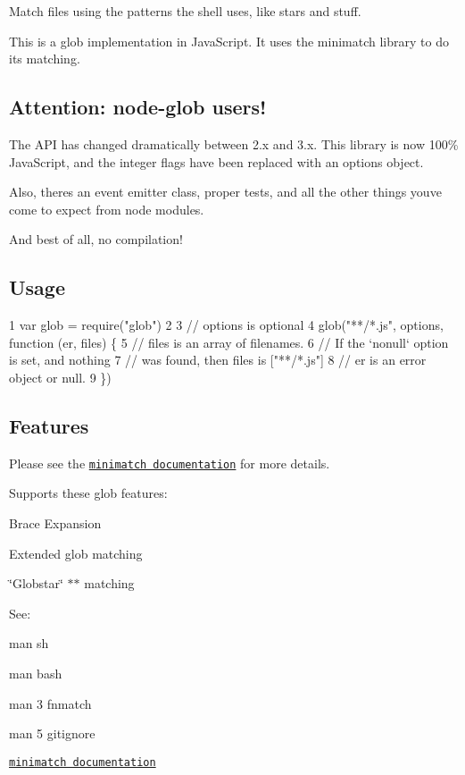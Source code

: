 Match files using the patterns the shell uses, like stars and stuff.

This is a glob implementation in Java\+Script. It uses the {\ttfamily minimatch} library to do its matching.

\subsection*{Attention\+: node-\/glob users!}

The A\+P\+I has changed dramatically between 2.\+x and 3.\+x. This library is now 100\% Java\+Script, and the integer flags have been replaced with an options object.

Also, there\textquotesingle{}s an event emitter class, proper tests, and all the other things you\textquotesingle{}ve come to expect from node modules.

And best of all, no compilation!

\subsection*{Usage}


\begin{DoxyCode}
1 var glob = require("glob")
2 
3 // options is optional
4 glob("**/*.js", options, function (er, files) \{
5   // files is an array of filenames.
6   // If the `nonull` option is set, and nothing
7   // was found, then files is ["**/*.js"]
8   // er is an error object or null.
9 \})
\end{DoxyCode}


\subsection*{Features}

Please see the \href{https://github.com/isaacs/minimatch}{\tt minimatch documentation} for more details.

Supports these glob features\+:


\begin{DoxyItemize}
\item Brace Expansion
\item Extended glob matching
\item \char`\"{}\+Globstar\char`\"{} {\ttfamily $\ast$$\ast$} matching
\end{DoxyItemize}

See\+:


\begin{DoxyItemize}
\item {\ttfamily man sh}
\item {\ttfamily man bash}
\item {\ttfamily man 3 fnmatch}
\item {\ttfamily man 5 gitignore}
\item \href{https://github.com/isaacs/minimatch}{\tt minimatch documentation}
\end{DoxyItemize}

